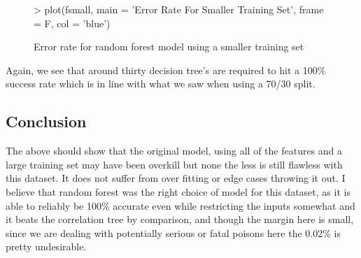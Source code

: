 \documentclass[10pt]{article}         %
\begin{document}
\pagebreak
\begin{figure}
\begin{center}
\begin{Schunk}
\begin{Sinput}
> plot(fsmall, main = 'Error Rate For Smaller Training Set', frame = F, col = 'blue')
\end{Sinput}
\end{Schunk}
\caption {Error rate for random forest model using a smaller training set}
\label{fig7}
\end {center}
\end {figure}
Again, we see that around thirty decision tree's are required to hit a 100\% success rate which is in line with what we saw when using a 70/30 split.

\subsection{Conclusion}
The above should show that the original model, using all of the features and a large training set may have been overkill but none the less is still flawless with this dataset. It does not suffer from over fitting or edge cases throwing it out. 
I believe that random forest was the right choice of model for this dataset, as it is able to reliably be 100\% accurate even while restricting the inputs somewhat and it beats the correlation tree by comparison, and though the margin here is small, since we are dealing with potentially serious or fatal poisons here the 0.02\% is pretty undesirable.
\end{document}
